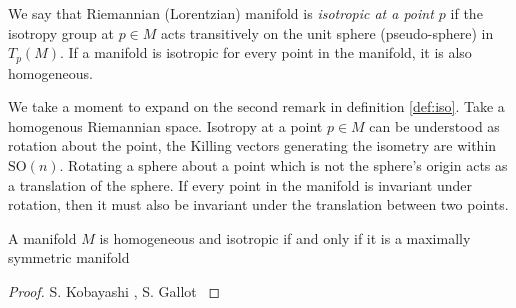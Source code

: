 \begin{defn}
\label{def:iso}
	We say that Riemannian (Lorentzian) manifold is \emph{isotropic at a point $p$} if the isotropy group at $p \in M$ acts transitively on the unit sphere (pseudo-sphere) in $T_p(M)$. If a manifold is isotropic for every point in the manifold, it is also homogeneous.
\end{defn}

We take a moment to expand on the second remark in definition \ref{def:iso}. Take a homogenous Riemannian space. Isotropy at a point $p \in M$ can be understood as rotation about the point, \ie the Killing vectors generating the isometry are within $\text{SO}(n)$. Rotating a sphere about a point which is not the sphere's origin acts as a translation of the sphere. If every point in the manifold is invariant under rotation, then it must also be invariant under the translation between two points.

\begin{prop}
	A manifold $M$ is homogeneous and isotropic if and only if it is a maximally symmetric manifold
\end{prop}
\begin{proof}
	S. Kobayashi \cite{kobayashi1967}, S. Gallot \cite{Gallot1987}
\end{proof}

